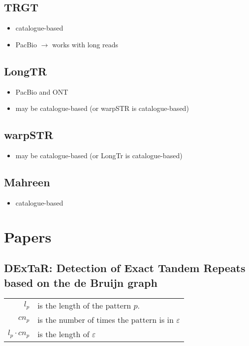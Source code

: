 \subsection{TRGT}
\cite{trgt}
\begin{itemize}
    \item catalogue-based
    \item PacBio $\rightarrow$ works with long reads
\end{itemize}

\subsection{LongTR}
\cite{longTR}
\begin{itemize}
    \item PacBio and ONT
    \item  may be catalogue-based (or warpSTR is catalogue-based)
\end{itemize}

\subsection{warpSTR}
\cite{warpSTR}
\begin{itemize}
    \item may be catalogue-based (or LongTr is catalogue-based)
\end{itemize}

\subsection{Mahreen}
\begin{itemize}
    \item catalogue-based
\end{itemize}

\section{Papers}
\subsection{DExTaR: Detection of Exact Tandem Repeats based on the de Bruijn graph \cite{Fertin2014DExTaRDO}}

\begin{table}[h]
    \begin{tabular}{rl}
        $l_p$           & is the length of the pattern $p$.                      \\
        $cn_p$          & is the number of times the pattern is in $\varepsilon$ \\
        $l_p\cdot cn_p$ & is the length of $\varepsilon$                         \\
    \end{tabular}
\end{table}

